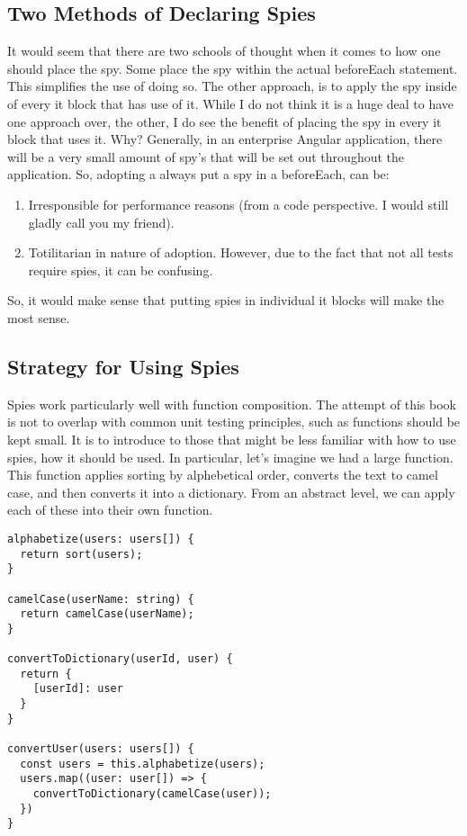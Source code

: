 \subsection{ Two Methods of Declaring Spies }
It would seem that there are two schools of thought when it comes to how one should
place the spy. Some place the spy within the actual beforeEach statement. This
simplifies the use of doing so. The other approach, is to apply the spy inside of
every it block that has use of it. While I do not think it is a huge deal to have
one approach over, the other, I do see the benefit of placing the spy in every
it block that uses it. Why? Generally, in an enterprise Angular application,
there will be a very small amount of spy's that will be set out throughout the
application. So, adopting a always put a spy in a beforeEach, can be:
\begin{enumerate}
  \item Irresponsible for performance reasons (from a code perspective. I would still gladly call you my friend).
  \item Totilitarian in nature of adoption. However, due to the fact that not
  all tests require spies, it can be confusing.
\end{enumerate}

So, it would make sense that putting spies in individual it blocks will make the
most sense.

\subsection{ Strategy for Using Spies }
Spies work particularly well with function composition. The attempt of this book
is not to overlap with common unit testing principles, such as functions should
be kept small. It is to introduce to those that might be less familiar with how
to use spies, how it should be used. In particular, let's imagine we had a large
function. This function applies sorting by alphebetical order, converts the text
to camel case, and then converts it into a dictionary. From an abstract level,
we can apply each of these into their own function.

\begin{lstlisting}
alphabetize(users: users[]) {
  return sort(users);
}

camelCase(userName: string) {
  return camelCase(userName);
}

convertToDictionary(userId, user) {
  return {
    [userId]: user
  }
}

convertUser(users: users[]) {
  const users = this.alphabetize(users);
  users.map((user: user[]) => {
    convertToDictionary(camelCase(user));
  })
}
\end{lstlisting}

